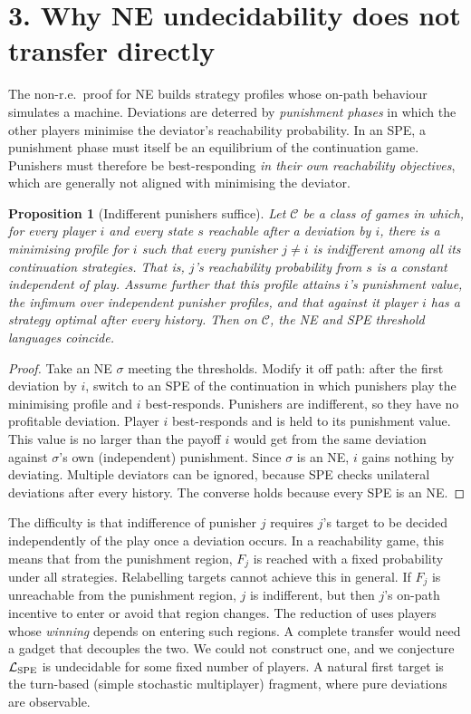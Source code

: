 \documentclass[11pt]{article}
\newtheorem{proposition}[theorem]{Proposition}
\theoremstyle{definition}
\begin{document}
\section*{3. Why NE undecidability does not transfer directly}
The non-r.e.\ proof for NE \cite{uw} builds strategy profiles whose on-path behaviour simulates a machine. Deviations
are deterred by \emph{punishment phases} in which the other players minimise the deviator's reachability probability. In
an SPE, a punishment phase must itself be an equilibrium of the continuation game. Punishers must therefore be best-responding
\emph{in their own reachability objectives}, which are generally not aligned with minimising the deviator.

\begin{proposition}[Indifferent punishers suffice]\label{prop:transfer}
Let $\mathcal C$ be a class of games in which, for every player $i$ and every state $s$ reachable after a deviation by
$i$, there is a minimising profile for $i$ such that every punisher $j\ne i$ is indifferent among all its continuation
strategies. That is, $j$'s reachability probability from $s$ is a constant independent of play. Assume further that this
profile attains $i$'s punishment value, the infimum over independent punisher profiles, and that against it player $i$ has
a strategy optimal after every history. Then on $\mathcal C$, the NE and SPE threshold languages coincide.
\end{proposition}
\begin{proof}
Take an NE $\sigma$ meeting the thresholds. Modify it off path: after the first deviation by $i$, switch to an SPE of the
continuation in which punishers play the minimising profile and $i$ best-responds. Punishers are indifferent, so they have
no profitable deviation. Player $i$ best-responds and is held to its punishment value. This value is no larger than the payoff $i$ would get
from the same deviation against $\sigma$'s own (independent) punishment. Since $\sigma$ is an NE, $i$ gains nothing by deviating. Multiple deviators can be ignored, because SPE checks unilateral deviations
after every history. The converse holds because every SPE is an NE.
\end{proof}
The difficulty is that indifference of punisher $j$ requires $j$'s target to be decided independently of the play once a
deviation occurs. In a reachability game, this means that from the punishment region, $F_j$ is reached with a fixed
probability under all strategies. Relabelling targets cannot achieve this in general. If $F_j$ is unreachable from the
punishment region, $j$ is indifferent, but then $j$'s on-path incentive to enter or avoid that region changes. The reduction
of \cite{uw} uses players whose \emph{winning} depends on entering such regions. A complete transfer would need a gadget
that decouples the two. We could not construct one, and we conjecture $\mathcal L_{\rm SPE}$ is undecidable for some
fixed number of players. A natural first target is the turn-based (simple stochastic multiplayer) fragment, where
pure deviations are observable.
\end{document}
